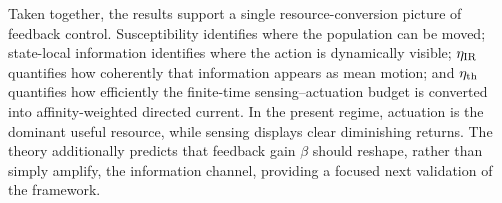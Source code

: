 Taken together, the results support a single resource-conversion picture of
feedback control. Susceptibility identifies where the population can be moved;
state-local information identifies where the action is dynamically visible;
$\eta_{\rm IR}$ quantifies how coherently that information appears as mean
motion; and $\eta_{\rm th}$ quantifies how efficiently the finite-time
sensing--actuation budget is converted into affinity-weighted directed current.
In the present regime, actuation is the dominant useful resource, while sensing
displays clear diminishing returns. The theory additionally predicts that
feedback gain $\beta$ should reshape, rather than simply amplify, the
information channel, providing a focused next validation of the framework.
